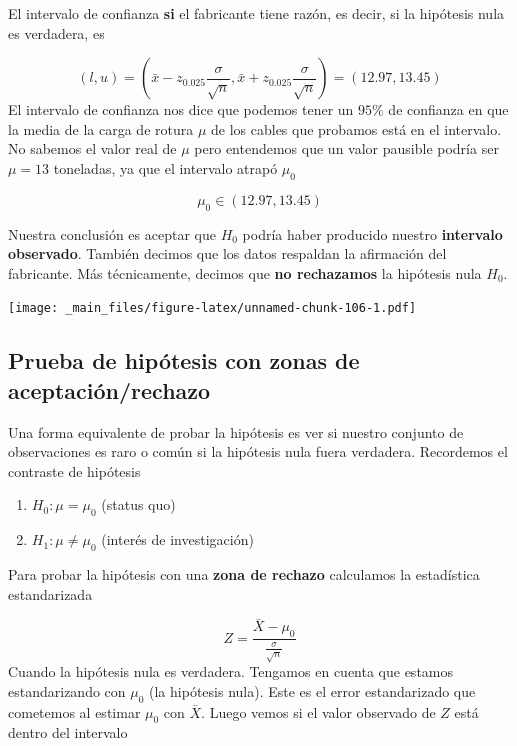 \documentclass[
]{book}
\providecommand{\tightlist}{%
  \setlength{\itemsep}{0pt}\setlength{\parskip}{0pt}}
\begin{document}
El intervalo de confianza \textbf{si} el fabricante tiene razón, es decir, si la hipótesis nula es verdadera, es

\[(l,u)=(\bar{x}-z_{0.025} \frac{\sigma}{\sqrt{n}}, \bar{x}+z_{0.025} \frac{\sigma}{ \sqrt{n}})= (12.97,13.45)\]
El intervalo de confianza nos dice que podemos tener un \(95\%\) de confianza en que la media de la carga de rotura \(\mu\) de los cables que probamos está en el intervalo. No sabemos el valor real de \(\mu\) pero entendemos que un valor pausible podría ser \(\mu=13\) toneladas, ya que el intervalo atrapó \(\mu_0\)

\[\mu_0\in (12.97,13.45)\]

Nuestra conclusión es aceptar que \(H_0\) podría haber producido nuestro \textbf{intervalo observado}. También decimos que los datos respaldan la afirmación del fabricante. Más técnicamente, decimos que \textbf{no rechazamos} la hipótesis nula \(H_0\).

\texttt{[image: \_main\_files/figure-latex/unnamed-chunk-106-1.pdf]}

\hypertarget{prueba-de-hipuxf3tesis-con-zonas-de-aceptaciuxf3nrechazo}{%
\subsection{Prueba de hipótesis con zonas de aceptación/rechazo}\label{prueba-de-hipuxf3tesis-con-zonas-de-aceptaciuxf3nrechazo}}

Una forma equivalente de probar la hipótesis es ver si nuestro conjunto de observaciones es raro o común si la hipótesis nula fuera verdadera. Recordemos el contraste de hipótesis

\begin{enumerate}
\def\labelenumi{\alph{enumi}.}
\tightlist
\item
  \(H_0:\mu = \mu_0\) (status quo)
\item
  \(H_1:\mu \neq \mu_0\) (interés de investigación)
\end{enumerate}

Para probar la hipótesis con una \textbf{zona de rechazo} calculamos la estadística estandarizada

\[Z=\frac{\bar{X}-\mu_0}{\frac{\sigma}{\sqrt{n}}}\]
Cuando la hipótesis nula es verdadera. Tengamos en cuenta que estamos estandarizando con \(\mu_0\) (la hipótesis nula). Este es el error estandarizado que cometemos al estimar \(\mu_0\) con \(\bar{X}\). Luego vemos si el valor observado de \(Z\) está dentro del intervalo
\end{document}
